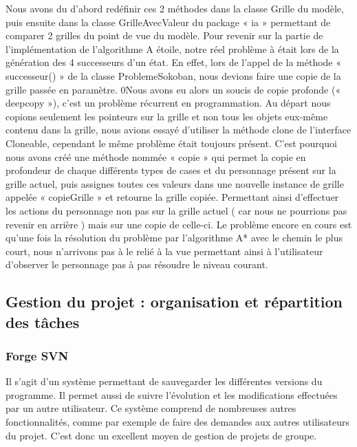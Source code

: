 \documentclass[a4paper,12pt]{article} %
\begin{document}
\newline
Nous avons du d’abord redéfinir ces 2 méthodes dans la classe Grille du modèle, puis ensuite dans la classe GrilleAvecValeur du package « ia » permettant de comparer 2 grilles du point de vue du modèle.
\newline\newline
Pour revenir sur la partie de l’implémentation de l’algorithme A étoile, notre réel problème à était lors de la génération des 4 successeurs d’un état. En effet, lors de l’appel de la méthode « successeur() » de la classe ProblemeSokoban, nous devions faire une copie de la grille passée en paramètre. 
\newline
0Nous avons eu alors un soucis de copie profonde (« deepcopy »), c’est un problème récurrent en programmation. Au départ nous copions seulement les pointeurs sur la grille et non tous les objets eux-même contenu dans la grille, nous avions essayé d’utiliser la méthode clone de l’interface Cloneable, cependant le même problème était toujours présent. 
\newline
C’est pourquoi nous avons créé une méthode nommée « copie » qui permet la copie en profondeur de chaque différents types de cases et du personnage présent sur la grille actuel, puis assignes toutes ces valeurs dans une nouvelle instance de grille appelée « copieGrille » et retourne la grille copiée. Permettant ainsi d’effectuer les actions du personnage non pas sur la grille actuel ( car nous ne pourrions pas revenir en arrière ) mais sur une copie de celle-ci.
\newline 
Le problème encore en cours est qu’une fois la résolution du problème par l’algorithme A* avec le chemin le plus court, nous n’arrivons pas à le relié à la vue permettant ainsi à l’utilisateur d’observer le personnage pas à pas résoudre le niveau courant.
\newpage

\subsection{Gestion du projet : organisation et répartition des tâches}
\subsubsection{Forge SVN}

Il s’agit d’un système permettant de sauvegarder les différentes versions du programme.
\newline
 Il permet aussi de suivre l’évolution et les modifications effectuées par un autre utilisateur. Ce système comprend de nombreuses autres fonctionnalités, comme par exemple de faire des demandes aux autres utilisateurs du projet.
\newline
C’est donc un excellent moyen de gestion de projets de groupe.
\end{document}
